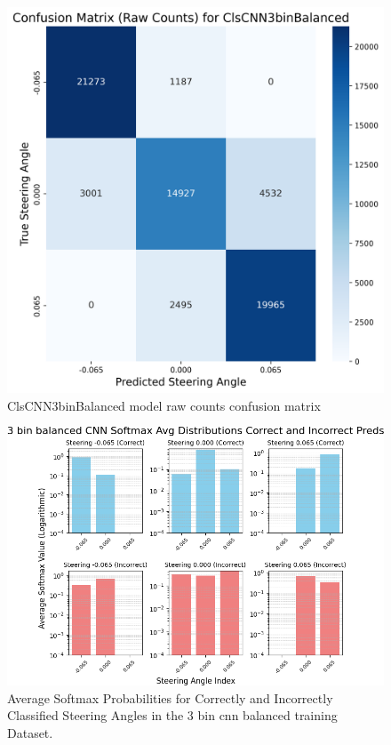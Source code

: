 \begin{figure}[H]
\centering
\includegraphics[width=0.65\linewidth]{Figures/Results/cm_raw_ClsCNN3binBalanced.png}
\caption{ClsCNN3binBalanced model raw counts confusion matrix}
\label{fig:cm_raw_ClsCNN3binBalanced}
\end{figure}

\begin{figure}[H]
    \centering
    \includegraphics[width=1\linewidth]{Figures/Results/3_bins_cnn_softmax_dist_plot_balanced.png}
    \caption{Average Softmax Probabilities for Correctly and Incorrectly Classified Steering Angles in the 3 bin cnn balanced training Dataset.}
    \label{fig:3_bins_cnn_softmax_dist_balanced}
\end{figure}


